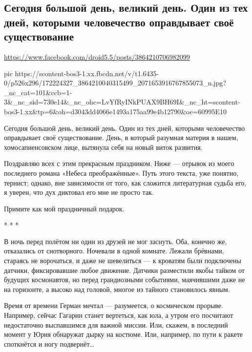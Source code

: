  
 
 
 
 
\subsection{Сегодня большой день, великий день. Один из тех дней, которыми человечество оправдывает своё существование}
\url{https://www.facebook.com/droid5.5/posts/3864210706982099}

\ifcmt
  pic https://scontent-bos3-1.xx.fbcdn.net/v/t1.6435-0/p526x296/172224327_3864210040315499_2071653916767855073_n.jpg?_nc_cat=101&ccb=1-3&_nc_sid=730e14&_nc_ohc=LvYfRyINkPUAX9BH69I&_nc_ht=scontent-bos3-1.xx&tp=6&oh=d3043dd4066e1493a175aa99e4b12790&oe=60995E10
\fi

Сегодня большой день, великий день. Один из тех дней, которыми человечество
оправдывает своё существование. День, в который разумная материя в нашем,
хомосапиенсовском лице, вытянула себя на новый виток развития.

Поздравляю всех с этим прекрасным праздником. Ниже — отрывок из моего
последнего романа «Небеса преображённые». Путь этого текста, уже понятно,
тернист; однако, вне зависимости от того, как сложится литературная судьба его,
я уверен, что дух диктовал его мне не просто так.

Примите как мой праздничный подарок.

*   *   *

В ночь перед полётом ни один из друзей не мог заснуть. Оба, конечно же,
отказались от снотворного. Ночевали в одной комнате. Лежали брёвнами, стараясь
не ворочаться, и даже не шевелиться — к кроватям были подключены датчики,
фиксировавшие любое движение. Датчики разместили якобы тайком от будущих
космонавтов, но перед грандиозными событиями, маячившими даже не на горизонте,
а высоко над головой, многое из тайного становилось явным.

Время от времени Герман мечтал — разумеется, о космическом прорыве. Например,
сейчас Гагарин станет вертеться, как юла, а утром его посчитают недостаточно
выспавшимся для важной миссии. Или, скажем, в последний момент у Юрия обнаружат
дырку на костюме. Или, например, по пути к ракете споткнётся и ногу подвернёт…


